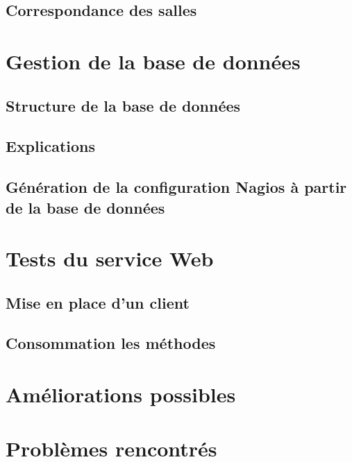 \subsection{Correspondance des salles}

\section{Gestion de la base de donn\'ees}

\subsection{Structure de la base de donn\'ees}

\subsection{Explications}

\subsection{G\'en\'eration de la configuration Nagios \`a partir de la base de donn\'ees}

\section{Tests du service Web}

\subsection{Mise en place d'un client}

\subsection{Consommation les m\'ethodes}

\section{Am\'eliorations possibles}

\section{Probl\`emes rencontr\'es}


\clearpage
